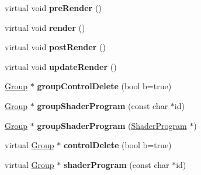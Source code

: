 \begin{DoxyCompactItemize}
\item 
\hypertarget{classj3d_1_1core_1_1Group_a571dd5f2e388e3f24f877e90e28476a4}{}virtual void {\bfseries pre\+Render} ()\label{classj3d_1_1core_1_1Group_a571dd5f2e388e3f24f877e90e28476a4}

\item 
\hypertarget{classj3d_1_1core_1_1Group_ad13c52f186a2c3e5ba1af430077baf07}{}virtual void {\bfseries render} ()\label{classj3d_1_1core_1_1Group_ad13c52f186a2c3e5ba1af430077baf07}

\item 
\hypertarget{classj3d_1_1core_1_1Group_aa1f2ee4e7f6d7856c37600772db0a2d4}{}virtual void {\bfseries post\+Render} ()\label{classj3d_1_1core_1_1Group_aa1f2ee4e7f6d7856c37600772db0a2d4}

\item 
\hypertarget{classj3d_1_1core_1_1Group_afc06584a76c0036c09811d865db14b93}{}virtual void {\bfseries update\+Render} ()\label{classj3d_1_1core_1_1Group_afc06584a76c0036c09811d865db14b93}

\item 
\hypertarget{classj3d_1_1core_1_1Group_af3af0a862eb113000d338bacbd929208}{}\hyperlink{classj3d_1_1core_1_1Group}{Group} $\ast$ {\bfseries group\+Control\+Delete} (bool b=true)\label{classj3d_1_1core_1_1Group_af3af0a862eb113000d338bacbd929208}

\item 
\hypertarget{classj3d_1_1core_1_1Group_aabd996d4773b60ad51013850c33e3760}{}\hyperlink{classj3d_1_1core_1_1Group}{Group} $\ast$ {\bfseries group\+Shader\+Program} (const char $\ast$id)\label{classj3d_1_1core_1_1Group_aabd996d4773b60ad51013850c33e3760}

\item 
\hypertarget{classj3d_1_1core_1_1Group_a289bc7043a3e58629e12e0efd5e96abc}{}\hyperlink{classj3d_1_1core_1_1Group}{Group} $\ast$ {\bfseries group\+Shader\+Program} (\hyperlink{classj3d_1_1ShaderProgram}{Shader\+Program} $\ast$)\label{classj3d_1_1core_1_1Group_a289bc7043a3e58629e12e0efd5e96abc}

\item 
\hypertarget{classj3d_1_1core_1_1Group_aa28abf8f52dcde0472d15fecaae65bf4}{}virtual \hyperlink{classj3d_1_1core_1_1Group}{Group} $\ast$ {\bfseries control\+Delete} (bool b=true)\label{classj3d_1_1core_1_1Group_aa28abf8f52dcde0472d15fecaae65bf4}

\item 
\hypertarget{classj3d_1_1core_1_1Group_a1bb4f33e3b6d0bcffc08cd123a940bae}{}virtual \hyperlink{classj3d_1_1core_1_1Group}{Group} $\ast$ {\bfseries shader\+Program} (const char $\ast$id)\label{classj3d_1_1core_1_1Group_a1bb4f33e3b6d0bcffc08cd123a940bae}


\end{DoxyCompactItemize}
